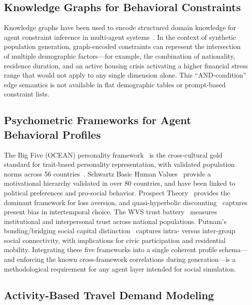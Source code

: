 \documentclass[sustainability,article,submit,pdftex,moreauthors]{Definitions/mdpi}
\begin{document}
\subsection{Knowledge Graphs for Behavioral Constraints}

Knowledge graphs have been used to encode structured domain knowledge for
agent constraint inference in multi-agent
systems~\cite{pan2023unifying,carrero2024integrating}. In the context of
synthetic population generation, graph-encoded constraints can represent the
intersection of multiple demographic factors---for example, the combination
of nationality, residence duration, and an active housing crisis activating
a higher financial stress range that would not apply to any single dimension
alone. This ``AND-condition'' edge semantics is not available in flat
demographic tables or prompt-based constraint lists.

\subsection{Psychometric Frameworks for Agent Behavioral Profiles}

The Big Five (OCEAN) personality framework~\cite{costa1992neopersonality}
is the cross-cultural gold standard for trait-based personality representation,
with validated population norms across 56 countries~\cite{schmitt2007geographic}.
Schwartz Basic Human Values~\cite{schwartz1992universals} provide a motivational
hierarchy validated in over 80 countries, and have been linked to political
preferences and pro-social behavior. Prospect Theory~\cite{kahneman1979prospect}
provides the dominant framework for loss aversion, and quasi-hyperbolic
discounting~\cite{laibson1997golden} captures present bias in intertemporal
choice. The WVS trust battery~\cite{inglehart2020worldvalues} measures
institutional and interpersonal trust across national populations. Putnam's
bonding/bridging social capital
distinction~\cite{putnam2000bowling} captures intra- versus inter-group
social connectivity, with implications for civic participation and
residential mobility. Integrating these five frameworks into a single
coherent profile schema---and enforcing the known cross-framework
correlations during generation---is a methodological requirement for
any agent layer intended for social simulation.

\subsection{Activity-Based Travel Demand Modeling}
\end{document}
